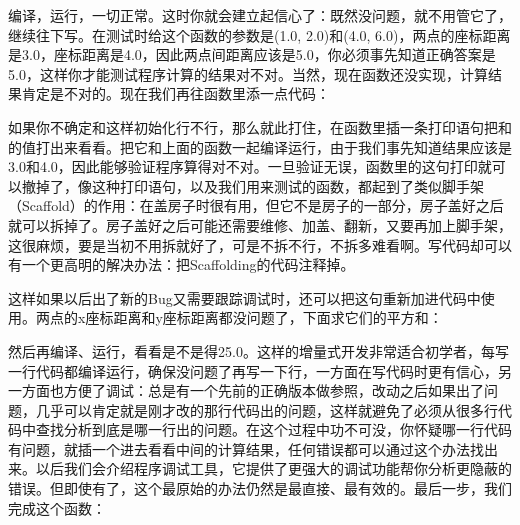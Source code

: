 

编译，运行，一切正常。这时你就会建立起信心了：既然没问题，就不用管它了，继续往下写。在测试时给这个函数的参数是(1.\BookSplit{}0, 2.\BookSplit{}0)和(4.\BookSplit{}0, 6.\BookSplit{}0)，两点的座标距离是3.\BookSplit{}0，座标距离是4.\BookSplit{}0，因此两点间距离应该是5.\BookSplit{}0，你必须事先知道正确答案是5.\BookSplit{}0，这样你才能测试程序计算的结果对不对。当然，现在函数还没实现，计算结果肯定是不对的。现在我们再往函数里添一点代码：




如果你不确定和这样初始化行不行，那么就此打住，在函数里插一条打印语句把和的值打出来看看。把它和上面的函数一起编译运行，由于我们事先知道结果应该是3.\BookSplit{}0和4.\BookSplit{}0，因此能够验证程序算得对不对。一旦验证无误，函数里的这句打印就可以撤掉了，像这种打印语句，以及我们用来测试的函数，都起到了类似脚手架（Scaffold）的作用：在盖房子时很有用，但它不是房子的一部分，房子盖好之后就可以拆掉了。房子盖好之后可能还需要维修、加盖、翻新，又要再加上脚手架，这很麻烦，要是当初不用拆就好了，可是不拆不行，不拆多难看啊。写代码却可以有一个更高明的解决办法：把Scaffolding的代码注释掉。




这样如果以后出了新的Bug又需要跟踪调试时，还可以把这句重新加进代码中使用。两点的x座标距离和y座标距离都没问题了，下面求它们的平方和：




然后再编译、运行，看看是不是得25.\BookSplit{}0。这样的增量式开发非常适合初学者，每写一行代码都编译运行，确保没问题了再写一下行，一方面在写代码时更有信心，另一方面也方便了调试：总是有一个先前的正确版本做参照，改动之后如果出了问题，几乎可以肯定就是刚才改的那行代码出的问题，这样就避免了必须从很多行代码中查找分析到底是哪一行出的问题。在这个过程中功不可没，你怀疑哪一行代码有问题，就插一个进去看看中间的计算结果，任何错误都可以通过这个办法找出来。以后我们会介绍程序调试工具，它提供了更强大的调试功能帮你分析更隐蔽的错误。但即使有了，这个最原始的办法仍然是最直接、最有效的。最后一步，我们完成这个函数：



